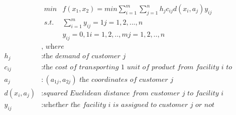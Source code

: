 \documentclass[12pt]{article}
\begin{document}
\begin{align*}
    min &f(x_1,x_2)=min \sum_{i=1}^{m}\sum_{j=1}^{n}h_jc_{ij}d(x_i,a_j)y_{ij} \\ 
    s.t. &\sum_{i=1}^{m}y_{ij}= 1       j=1,2,...,n\\
    &y_{ij}=0,1      i=1,2,..,m  j=1,2,..,n    
\end{align*}
\begin{equation*}
    \begin{split}
    &\textit{, where }\\
        h_j &: \textit{the demand of customer j} \\
        c_{ij} &: \textit{the cost of transporting 1 unit of product from facility i to customer j per unit distance}\\
        a_j &: (a_{1j} , a_{2j}) \textit{ the coordinates of customer j} \\
        d(x_i,a_j) &: \textit{squared Euclidean distance from customer j to facility i} \\
        y_{ij} &: \textit{whether the facility i is assigned to customer j or not}
    \end{split}
\end{equation*}
\end{document}
